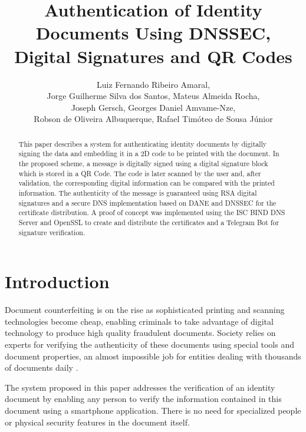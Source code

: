 \documentclass[12pt]{article}
\title{Authentication of Identity Documents Using DNSSEC, Digital Signatures and QR Codes}
\author{Luiz Fernando Ribeiro Amaral\inst{1},\\ 
Jorge Guilherme Silva dos Santos\inst{1}, Mateus Almeida Rocha\inst{1}, \\ 
Joseph Gersch\inst{2}, Georges Daniel Amvame-Nze\inst{1},\\ 
Robson de Oliveira Albuquerque\inst{1}, Rafael Timóteo de Sousa Júnior\inst{1}}
\begin{document}
 


\maketitle

\begin{abstract}
  This paper describes a system for authenticating identity documents by digitally signing the data and embedding it in a 2D code to be printed with the document. In the proposed scheme, a message is digitally signed using a digital signature block which is stored in a QR Code. The code is later scanned by the user and, after validation, the corresponding digital information can be compared with the printed information. The authenticity of the message is guaranteed using RSA digital signatures and a secure DNS implementation based on DANE and DNSSEC for the certificate distribution. A proof of concept was implemented using the ISC BIND DNS Server and OpenSSL to create and distribute the certificates and a Telegram Bot for signature verification.
\end{abstract}
     
\section{Introduction}

Document counterfeiting is on the rise as sophisticated printing and scanning technologies become cheap, enabling criminals to take advantage of digital technology to produce high quality fraudulent documents. Society relies on experts for verifying the authenticity of these documents using special tools and document properties, an almost impossible job for entities dealing with thousands of documents daily \cite{garain2008automatic}. 

The system proposed in this paper addresses the verification of an identity document by enabling any person to verify the information contained in this document using a smartphone application. There is no need for specialized people or physical security features in the document itself. 
\end{document}
